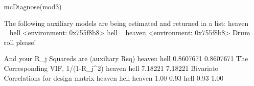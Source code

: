 \begin{Schunk}
\begin{Sinput}
 mcDiagnose(mod3)
\end{Sinput}
\begin{Soutput}
The following auxiliary models are being estimated and returned in a list:
heaven ~ hell
<environment: 0x755f8b8>
hell ~ heaven
<environment: 0x755f8b8>
Drum roll please! 

And your R_j Squareds are (auxiliary Rsq)
   heaven      hell 
0.8607671 0.8607671 
The Corresponding VIF, 1/(1-R_j^2)
 heaven    hell 
7.18221 7.18221 
Bivariate Correlations for design matrix 
       heaven hell
heaven   1.00 0.93
hell     0.93 1.00
\end{Soutput}
\end{Schunk}
